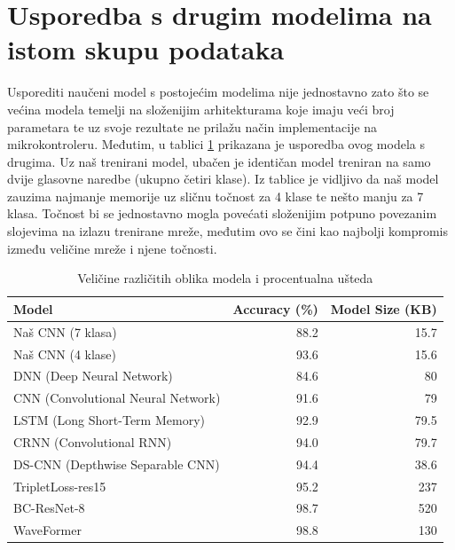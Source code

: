 \section{Usporedba s drugim modelima na istom skupu podataka}

Usporediti naučeni model s postojećim modelima nije jednostavno zato što
se većina modela temelji na složenijim arhitekturama koje imaju veći broj parametara te
uz svoje rezultate ne prilažu način implementacije na mikrokontroleru. Međutim,
u tablici \ref{tab:models} prikazana je usporedba ovog modela s drugima. Uz naš trenirani model,
ubačen je identičan model treniran na samo dvije glasovne naredbe (ukupno četiri klase).
Iz tablice je vidljivo da naš model zauzima najmanje memorije uz sličnu točnost za 4 klase te
nešto manju za 7 klasa. Točnost bi se jednostavno mogla povećati složenijim potpuno povezanim
slojevima na izlazu trenirane mreže, međutim ovo se čini kao najbolji kompromis između veličine
mreže i njene točnosti.

\begin{table}[htb]
    \centering
    \begin{tabular}{|l|r|r|}
        \hline
        \textbf{Model} & \textbf{Accuracy (\%)} & \textbf{Model Size (KB)} \\ \hline
        Naš CNN (7 klasa) & 88.2 & 15.7 \\ 
        Naš CNN (4 klase) & 93.6 & 15.6 \\ 
        DNN (Deep Neural Network)          \cite{zhang2017hello} & 84.6 & 80 \\
        CNN (Convolutional Neural Network) \cite{zhang2017hello} & 91.6 & 79 \\
        LSTM (Long Short-Term Memory)      \cite{zhang2017hello} & 92.9 & 79.5 \\
        CRNN (Convolutional RNN)           \cite{zhang2017hello} & 94.0 & 79.7 \\
        DS-CNN (Depthwise Separable CNN)   \cite{zhang2017hello} & 94.4 & 38.6  \\
        TripletLoss-res15 \cite{triplet} & 95.2 & 237 \\
        BC-ResNet-8 \cite{res} & 98.7 & 520 \\
        WaveFormer \cite{waveformer} & 98.8 & 130  \\
        \hline
    \end{tabular}
    \caption{Veličine različitih oblika modela i procentualna ušteda}
    \label{tab:models}
\end{table}
